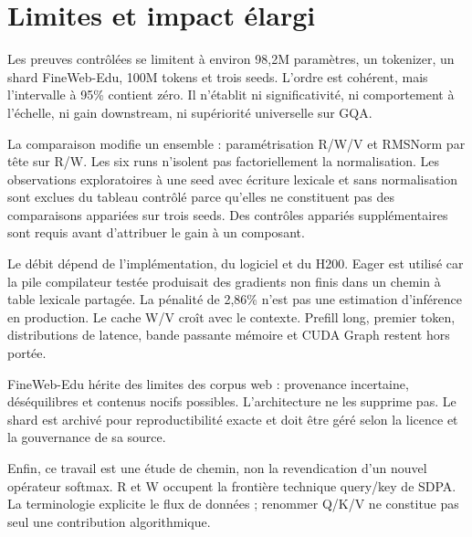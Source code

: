 \section{Limites et impact élargi}

Les preuves contrôlées se limitent à environ 98,2M paramètres, un tokenizer, un shard FineWeb-Edu, 100M tokens et trois seeds. L'ordre est cohérent, mais l'intervalle à 95\% contient zéro. Il n'établit ni significativité, ni comportement à l'échelle, ni gain downstream, ni supériorité universelle sur GQA.

La comparaison modifie un ensemble : paramétrisation R/W/V et RMSNorm par tête sur R/W. Les six runs n'isolent pas factoriellement la normalisation. Les observations exploratoires à une seed avec écriture lexicale et sans normalisation sont exclues du tableau contrôlé parce qu'elles ne constituent pas des comparaisons appariées sur trois seeds. Des contrôles appariés supplémentaires sont requis avant d'attribuer le gain à un composant.

Le débit dépend de l'implémentation, du logiciel et du H200. Eager est utilisé car la pile compilateur testée produisait des gradients non finis dans un chemin à table lexicale partagée. La pénalité de 2,86\% n'est pas une estimation d'inférence en production. Le cache W/V croît avec le contexte. Prefill long, premier token, distributions de latence, bande passante mémoire et CUDA Graph restent hors portée.

FineWeb-Edu hérite des limites des corpus web : provenance incertaine, déséquilibres et contenus nocifs possibles. L'architecture ne les supprime pas. Le shard est archivé pour reproductibilité exacte et doit être géré selon la licence et la gouvernance de sa source.

Enfin, ce travail est une étude de chemin, non la revendication d'un nouvel opérateur softmax. R et W occupent la frontière technique query/key de SDPA. La terminologie explicite le flux de données ; renommer Q/K/V ne constitue pas seul une contribution algorithmique.